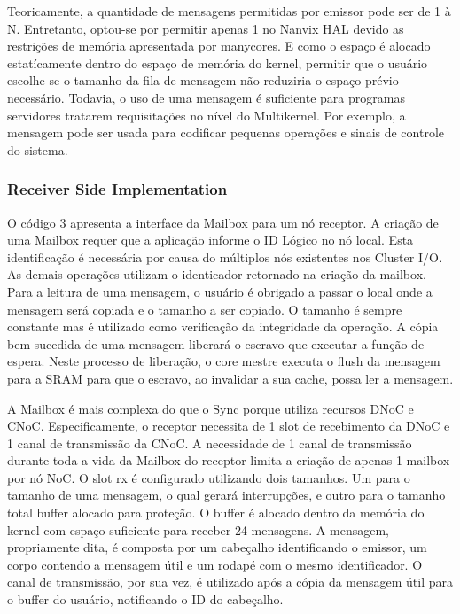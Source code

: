 			Teoricamente, a quantidade de mensagens permitidas por emissor pode ser de 1 à N.
			Entretanto, optou-se por permitir apenas 1 no Nanvix HAL devido as restrições de memória apresentada por manycores.
			E como o espaço é alocado estatícamente dentro do espaço de memória do kernel, permitir que o usuário escolhe-se o tamanho da fila de mensagem não reduziria o espaço prévio necessário.
			Todavia, o uso de uma mensagem é suficiente para programas servidores tratarem requisitações no nível do Multikernel.
			Por exemplo, a mensagem pode ser usada para codificar pequenas operações e sinais de controle do sistema.

			\subsubsection{Receiver Side Implementation}

				O código 3 apresenta a interface da Mailbox para um nó receptor.
				A criação de uma Mailbox requer que a aplicação informe o ID Lógico no nó local.
				Esta identificação é necessária por causa do múltiplos nós existentes nos Cluster I/O.
				As demais operações utilizam o identicador retornado na criação da mailbox.
				Para a leitura de uma mensagem, o usuário é obrigado a passar o local onde a mensagem será copiada e o tamanho a ser copiado.
				O tamanho é sempre constante mas é utilizado como verificação da integridade da operação.
				A cópia bem sucedida de uma mensagem liberará o escravo que executar a função de espera.
				Neste processo de liberação, o core mestre executa o flush da mensagem para a SRAM para que o escravo, ao invalidar a sua cache, possa ler a mensagem.

				A Mailbox é mais complexa do que o Sync porque utiliza recursos DNoC e CNoC.
				Especificamente, o receptor necessita de 1 slot de recebimento da DNoC e 1 canal de transmissão da CNoC.
				A necessidade de 1 canal de transmissão durante toda a vida da Mailbox do receptor limita a criação de apenas 1 mailbox por nó NoC.
				O slot rx é configurado utilizando dois tamanhos.
				Um para o tamanho de uma mensagem, o qual gerará interrupções, e outro para o tamanho total buffer alocado para proteção.
				O buffer é alocado dentro da memória do kernel com espaço suficiente para receber 24 mensagens.
				A mensagem, propriamente dita, é composta por um cabeçalho identificando o emissor, um corpo contendo a mensagem útil e um rodapé com o mesmo identificador.
				O canal de transmissão, por sua vez, é utilizado após a cópia da mensagem útil para o buffer do usuário, notificando o ID do cabeçalho.


